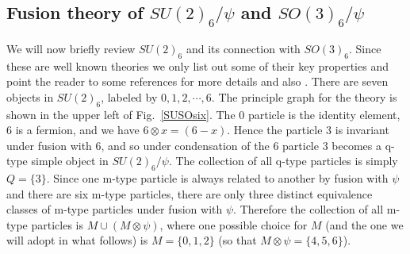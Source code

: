 \documentclass[12pt,a4paper]{article}
\newcommand{\tp}{\otimes}
\newcommand{\mcc}{\mathcal{C}}
\begin{document}

\subsection{Fusion theory of $SU(2)_6/\psi$ and $SO(3)_6/\psi$}

We will now briefly review $SU(2)_6$ and its connection with $SO(3)_6$.
Since these are well known theories we only list out some of their key properties and point the 
reader to some references for more details \cite{kirillow1989} and also \cite{Bonderson2007}.
There are seven objects in $SU(2)_6$, labeled by $0,1,2,\cdots, 6$.
The principle graph for the theory is shown in the upper left of Fig.~\ref{SUSOsix}. 
The $0$ particle is the identity element, $6$ is a fermion, and we have $6 \tp x = (6-x)$. 
Hence the particle $3$ is invariant under fusion with $6$, and so under condensation of the $6$ 
particle $3$ becomes a q-type simple object in $SU(2)_6/\psi$.
The collection of all q-type particles is simply $Q=\{3\}$. 
Since one m-type particle is always related to another by fusion with $\psi$ and 
there are six m-type particles, there are only three distinct equivalence classes of m-type
particles under fusion with $\psi$. Therefore the collection of all m-type particles is
$M\cup (M\tp \psi)$, where one possible choice for $M$ (and the one
we will adopt in what follows) is $M=\{0,1,2\}$ (so that $M\tp \psi = \{4,5,6\}$). 
\end{document}
